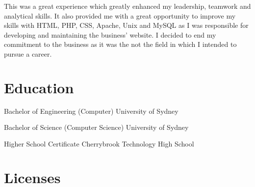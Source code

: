 \documentclass[10pt]{article}
\begin{document}
\begin{professionalExperience}
{This was a great experience which greatly enhanced my leadership, teamwork and 
analytical skills. It also provided me with a great opportunity to improve my 
skills with HTML, PHP, CSS, Apache, Unix and MySQL as I was responsible for 
developing and maintaining the business' website. I decided to end my commitment
to the business as it was the not the field in which I intended to pursue a 
career.}
{
}

\end{professionalExperience}

\section*{Education}
\begin{education}

{Bachelor of Engineering (Computer)}
{University of Sydney}
{}

{Bachelor of Science (Computer Science)}
{University of Sydney}
{}

{Higher School Certificate}
{Cherrybrook Technology High School}
{
}
\end{education}

\section*{Licenses}
\begin{licenses}
\end{licenses}

\end{document}

